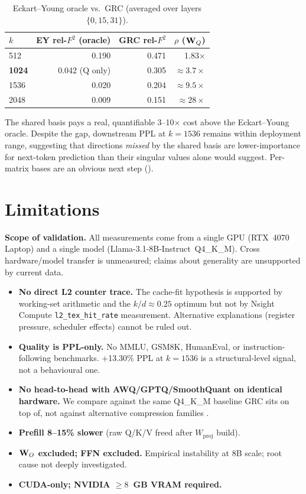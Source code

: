 \documentclass[11pt]{article}
\begin{document}
\begin{table}[h]\centering\small
\caption{Eckart--Young oracle vs.\ GRC (averaged over layers $\{0,15,31\}$).}
\label{tab:ey}
\begin{tabular}{@{}lrrr@{}}
\toprule
$k$ & EY rel-$F^2$ (oracle) & GRC rel-$F^2$ & $\rho$ ($\mathbf{W}_Q$) \\
\midrule
512  & 0.190 & 0.471 & 1.83$\times$ \\
\textbf{1024} & 0.042 (Q only) & 0.305 & $\approx 3.7\times$ \\
1536 & 0.020 & 0.204 & $\approx 9.5\times$ \\
2048 & 0.009 & 0.151 & $\approx 28\times$ \\
\bottomrule
\end{tabular}
\end{table}

The shared basis pays a real, quantifiable 3--10$\times$ cost above the
Eckart--Young oracle.  Despite the gap, downstream PPL at $k{=}1536$ remains
within deployment range, suggesting that directions \emph{missed} by the
shared basis are lower-importance for next-token prediction than their
singular values alone would suggest.  Per-matrix bases are an obvious next
step ().

\section{Limitations}
\label{sec:limits}

\begin{htwarn}
\textbf{Scope of validation.}  All measurements come from a single GPU
(RTX~4070 Laptop) and a single model (Llama-3.1-8B-Instruct~Q4\_K\_M).  Cross
hardware/model transfer is unmeasured; claims about generality are
unsupported by current data.
\end{htwarn}

\begin{itemize}
\item \textbf{No direct L2 counter trace.}  The cache-fit hypothesis is
supported by working-set arithmetic and the $k/d{\approx}0.25$ optimum but
not by Nsight Compute \texttt{l2\_tex\_hit\_rate} measurement.  Alternative
explanations (register pressure, scheduler effects) cannot be ruled out.
\item \textbf{Quality is PPL-only.}  No MMLU, GSM8K, HumanEval, or instruction-
following benchmarks.  +13.30\% PPL at $k{=}1536$ is a structural-level
signal, not a behavioural one.
\item \textbf{No head-to-head with AWQ/GPTQ/SmoothQuant on identical
hardware.}  We compare against the same Q4\_K\_M baseline GRC sits on top
of, not against alternative compression families
\cite{lin2023awq,frantar2022gptq,xiao2022smoothquant}.
\item \textbf{Prefill 8--15\% slower} (raw Q/K/V freed after $W_\text{proj}$ build).
\item \textbf{$\mathbf{W}_O$ excluded; FFN excluded.}  Empirical instability at
8B scale; root cause not deeply investigated.
\item \textbf{CUDA-only; NVIDIA $\geq 8$~GB VRAM required.}
\end{itemize}
\end{document}
